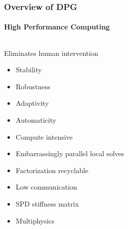 \documentclass[18pt,xcolor=table]{beamer}
\begin{document}
\begin{frame}[t]
\frametitle{Overview of DPG}
\framesubtitle{High Performance Computing}
\begin{columns}[c]
\begin{column}{.5\textwidth}
Eliminates human intervention
\medskip

\begin{itemize}
  \item Stability
  \item Robustness
  \item Adaptivity
  \item Automaticity
  \item Compute intensive
  \item Embarrassingly parallel local solves
  \item Factorization recyclable
  \item Low communication
  \item SPD stiffness matrix
  \item Multiphysics
\end{itemize}


\end{column}
\end{columns}
\end{frame}
\end{document}
